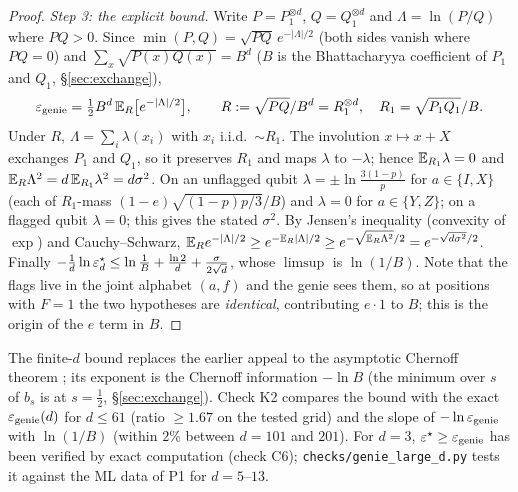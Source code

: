 \begin{proof}
\emph{Step 3: the explicit bound.} Write $P=P_1^{\otimes d}$, $Q=Q_1^{\otimes d}$ and $\Lambda=\ln(P/Q)$ where $PQ>0$. Since $\min(P,Q)=\sqrt{PQ}\,e^{-|\Lambda|/2}$ (both sides vanish where $PQ=0$) and $\sum_x\sqrt{P(x)Q(x)}=B^d$
($B$ is the Bhattacharyya coefficient of $P_1$ and $Q_1$, \S\ref{sec:exchange}),
\[
\varepsilon_{\rm genie}=\tfrac12B^d\,\mathbb{E}_R\big[e^{-|\Lambda|/2}\big],\qquad R:=\sqrt{PQ}/B^d=R_1^{\otimes d},\quad R_1=\sqrt{P_1Q_1}/B .
\]
Under $R$, $\Lambda=\sum_i\lambda(x_i)$ with $x_i$ i.i.d.\ $\sim R_1$. The involution $x\mapsto x+X$ exchanges $P_1$ and $Q_1$, so it preserves $R_1$ and maps $\lambda$ to $-\lambda$; hence $\mathbb{E}_{R_1}\lambda=0$ and $\mathbb{E}_R\Lambda^2=d\,\mathbb{E}_{R_1}\lambda^2=d\sigma^2$.
On an unflagged qubit $\lambda=\pm\ln\frac{3(1-p)}p$ for $a\in\{I,X\}$ (each of $R_1$-mass $(1-e)\sqrt{(1-p)p/3}/B$) and $\lambda=0$ for $a\in\{Y,Z\}$; on a flagged qubit $\lambda=0$; this gives the stated $\sigma^2$.
By Jensen's inequality (convexity of $\exp$) and Cauchy--Schwarz, $\mathbb{E}_R e^{-|\Lambda|/2}\ge e^{-\mathbb{E}_R|\Lambda|/2}\ge e^{-\sqrt{\mathbb{E}_R\Lambda^2}/2}=e^{-\sqrt{d\sigma^2}/2}$.
Finally $-\tfrac1d\ln\varepsilon^{\star}_d\le\ln\tfrac1B+\tfrac{\ln2}d+\tfrac{\sigma}{2\sqrt d}$, whose $\limsup$ is $\ln(1/B)$.
Note that the flags live in the joint alphabet $(a,f)$ and the genie sees them, so at positions with $F=1$ the two hypotheses are \emph{identical},
contributing $e\cdot1$ to $B$; this is the origin of the $e$ term in $B$.
\end{proof}

\noindent The finite-$d$ bound replaces the earlier appeal to the asymptotic Chernoff theorem \cite[\S11.9]{CT}; its exponent is the Chernoff information $-\ln B$ (the minimum over $s$ of $b_s$ is at $s=\tfrac12$, \S\ref{sec:exchange}).
Check K2 compares the bound with the exact $\varepsilon_{\rm genie}(d)$ for $d\le61$ (ratio $\ge1.67$ on the tested grid) and the slope of $-\ln\varepsilon_{\rm genie}$ with $\ln(1/B)$ (within $2\%$ between $d=101$ and $201$).
For $d=3$, $\varepsilon^{\star}\ge\varepsilon_{\rm genie}$ has been verified by exact computation (check C6); \texttt{checks/genie\_large\_d.py} tests it against the ML data of P1 for $d=5$--$13$.

